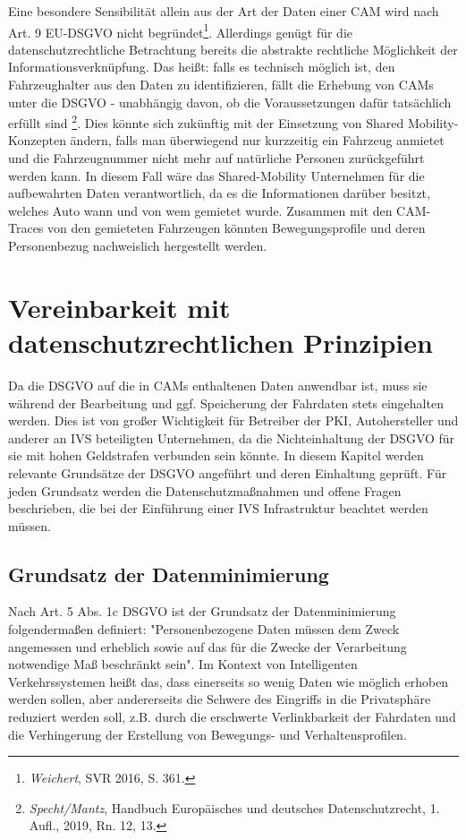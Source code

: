 Eine besondere Sensibilität allein aus der Art der Daten einer CAM wird nach Art. 9 EU-DSGVO nicht begründet\footnote{\emph{Weichert}, SVR 2016, S. 361.}\nocite{Weichert2016}. Allerdings genügt für die datenschutzrechtliche Betrachtung bereits die abstrakte rechtliche Möglichkeit der Informationsverknüpfung. Das heißt: falls es technisch möglich ist, den Fahrzeughalter aus den Daten zu identifizieren, fällt die Erhebung von CAMs unter die DSGVO - unabhängig davon, ob die Voraussetzungen dafür tatsächlich erfüllt sind  \footnote{\emph{Specht/Mantz}, Handbuch Europäisches und deutsches Datenschutzrecht, 1. Aufl., 2019, Rn. 12, 13.}. Dies könnte sich zukünftig mit der Einsetzung von Shared Mobility-Konzepten ändern, falls man überwiegend nur kurzzeitig ein Fahrzeug anmietet und die Fahrzeugnummer nicht mehr auf natürliche Personen zurückgeführt werden kann. In diesem Fall wäre das Shared-Mobility Unternehmen für die aufbewahrten Daten verantwortlich, da es die Informationen darüber besitzt, welches Auto wann und von wem gemietet wurde. Zusammen mit den CAM-Traces von den gemieteten Fahrzeugen könnten Bewegungsprofile und deren Personenbezug nachweislich hergestellt werden.


\section{Vereinbarkeit mit datenschutzrechtlichen Prinzipien}
\label{ch:ThirdContentSection}

Da die DSGVO auf die in CAMs enthaltenen Daten anwendbar ist, muss sie während der Bearbeitung und ggf. Speicherung der Fahrdaten stets eingehalten werden. Dies ist von großer Wichtigkeit für Betreiber der PKI, Autohersteller und anderer an IVS beteiligten Unternehmen, da die Nichteinhaltung der DSGVO für sie mit hohen Geldstrafen verbunden sein könnte. In diesem Kapitel werden relevante Grundsätze der DSGVO angeführt und deren Einhaltung geprüft. Für jeden Grundsatz werden die Datenschutzmaßnahmen und offene Fragen beschrieben, die bei der Einführung einer IVS Infrastruktur beachtet werden müssen. 

\subsection{Grundsatz der Datenminimierung}

Nach Art. 5 Abs. 1c DSGVO ist der Grundsatz der Datenminimierung folgendermaßen definiert: "Personenbezogene Daten müssen dem Zweck angemessen und erheblich sowie auf das für die Zwecke der Verarbeitung notwendige Maß beschränkt sein". Im Kontext von Intelligenten Verkehrssystemen heißt das, dass einerseits so wenig Daten wie möglich erhoben werden sollen, aber andererseits die Schwere des Eingriffs in die Privatsphäre reduziert werden soll, z.B. durch die erschwerte Verlinkbarkeit der Fahrdaten und die Verhingerung der Erstellung von Bewegungs- und Verhaltensprofilen. 

